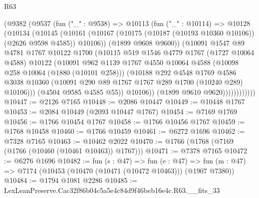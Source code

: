 \begin{lexlean}{R63}
\begin{coremodule}
                  (@9382
                    (@9537
                      (fun ("_" : @9538) =>
                      @10113
                        (fun ("_" : @10114) =>
                        @10128
                          (@10134
                            (@10145
                              (@10161
                                (@10167
                                  (@10175 (@10187 (@10193 @10360 @10106)) (@2626 @9598 @4585))
                                  @10106))
                              (@1899 @9608 @9600))
                            (@10091
                              @1547
                              @89
                              @4781
                              @1767
                              @10122
                              @1700
                              (@10115
                                @519
                                @1546
                                @4779
                                @1767
                                (@1727 @10064 @4588)
                                @10122
                                (@10091
                                  @962
                                  @1139
                                  @1767
                                  @4550
                                  @10064
                                  @4588
                                  (@10098 @258 @10064 (@1880 (@10101 @258)))
                                  (@10188
                                    @292
                                    @4548
                                    @1769
                                    @4586
                                    @3038
                                    @10360
                                    (@10091 @290 @89 @1767 @1767 @289 @1700 (@10240 @289) @10106)))
                                (@4504 @9585 @4585 @55))
                              @10106))
                          (@1899 @9610 @9620))))))))))))
@10447 := @2126 @7165
@10448 := @2086 @10447
@10449 := @10448 @1767
@10453 := @2084 @10449 (@2093 @10447 @1767)
@10454 := @7169 @1769
@10456 := @1766 @10454 @1767
@10458 := @1766 @10456 @1767
@10459 := @1768 @10458
@10460 := @1766 @10459
@10461 := @6272 @1696
@10462 := @7328 @7165
@10463 := @10462 @2022
@10470 := @1766 (@1768 (@7169 (@1766 (@10460 (@10461 @10463)) @1767)))
@10471 := @7378 @7165
@10472 := @6276 @1696
@10482 := fun (s : @47) =>
  fun (e : @47) => fun (m : @47) => @7174 (@10453 (@10470 (@10471 (@10472 @10463))) (@1907 @7380))
@10484 := @1794 @1081 @2286
@10485 := LexLeanPreserve.Cac32f86b04c5a5e4c84d9f46beb16e4c.R63.__fits_33

\end{coremodule}
\end{lexlean}

